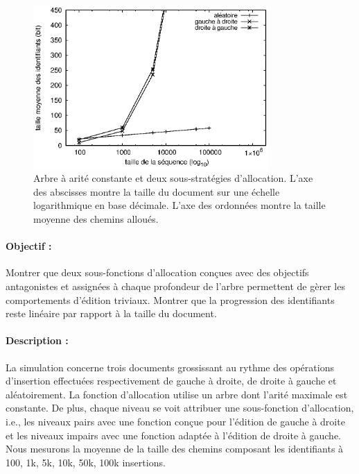 \begin{figure}
  \begin{center}
    \includegraphics[width=0.8\textwidth]{img/lseq/robin.eps}
    \caption[Influence de deux sous-fonctions d'allocations sur la taille des
    chemins] {\label{repl:img:suballocation} Arbre à arité constante et deux
      sous-stratégies d'allocation. L'axe des abscisses montre la taille du
      document sur une échelle logarithmique en base décimale. L'axe des
      ordonnées montre la taille moyenne des chemins alloués.}
  \end{center}
\end{figure}

\paragraph{Objectif :} Montrer que deux sous-fonctions d'allocation conçues avec
des objectifs antagonistes et assignées à chaque profondeur de l'arbre
permettent de gèrer les comportements d'édition triviaux. Montrer que la
progression des identifiants reste linéaire par rapport à la taille du document.

\paragraph{Description :} La simulation concerne trois documents grossissant au
rythme des opérations d'insertion effectuées respectivement de gauche à droite,
de droite à gauche et aléatoirement. La fonction d'allocation utilise un arbre
dont l'arité maximale est constante. De plus, chaque niveau se voit attribuer
une sous-fonction d'allocation, i.e., les niveaux pairs avec une fonction conçue
pour l'édition de gauche à droite et les niveaux impairs avec une fonction
adaptée à l'édition de droite à gauche. Nous mesurons la moyenne de la taille
des chemins composant les identifiants à 100, 1k, 5k, 10k, 50k, 100k insertions.

